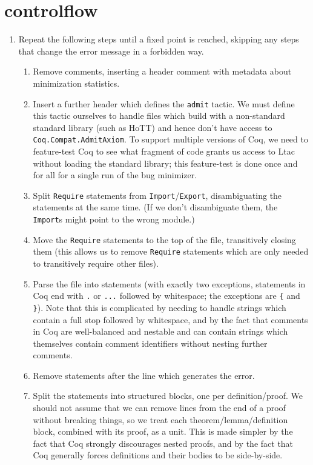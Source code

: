 \documentclass[a4paper,USenglish,cleveref,autoref,thm-restate]{lipics-v2021}
\begin{document}
\section{controlflow}
\begin{enumerate}
\item Repeat the following steps until a fixed point is reached, skipping any steps that change the error message in a forbidden way.
\begin{enumerate}
\item Remove comments, inserting a header comment with metadata about minimization statistics.
\item Insert a further header which defines the \verb|admit| tactic.
  We must define this tactic ourselves to handle files which build with a non-standard standard library (such as HoTT) and hence don't have access to \verb|Coq.Compat.AdmitAxiom|.
  To support multiple versions of Coq, we need to feature-test Coq to see what fragment of code grants us access to Ltac without loading the standard library; this feature-test is done once and for all for a single run of the bug minimizer.
\item Split \verb|Require| statements from \verb|Import|/\verb|Export|, disambiguating the statements at the same time.
  (If we don't disambiguate them, the \verb|Import|s might point to the wrong module.)
\item Move the \verb|Require| statements to the top of the file, transitively closing them (this allows us to remove \verb|Require| statements which are only needed to transitively require other files).
\item Parse the file into statements (with exactly two exceptions, statements in Coq end with \verb|.| or \verb|...| followed by whitespace; the exceptions are \verb|{| and \verb|}|).
  Note that this is complicated by needing to handle strings which contain a full stop followed by whitespace, and by the fact that comments in Coq are well-balanced and nestable and can contain strings which themselves contain comment identifiers without nesting further comments.
\item Remove statements after the line which generates the error.
\item Split the statements into structured blocks, one per definition/proof.
  We should not assume that we can remove lines from the end of a proof without breaking things, so we treat each theorem/lemma/definition block, combined with its proof, as a unit.
  This is made simpler by the fact that Coq strongly discourages nested proofs, and by the fact that Coq generally forces definitions and their bodies to be side-by-side.

\end{enumerate}
\end{enumerate}
\end{document}
